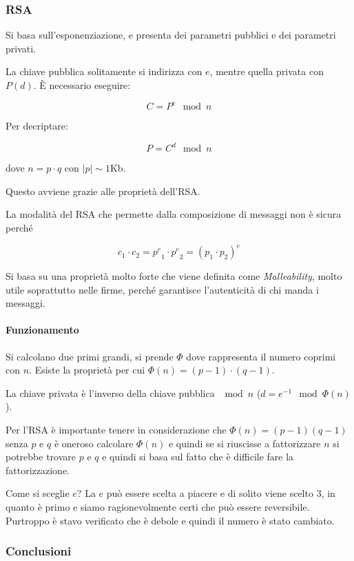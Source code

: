 \subsubsection{RSA}

Si basa sull'esponenziazione, e presenta dei parametri pubblici e dei parametri
privati.


La chiave pubblica solitamente si indirizza con $e$, mentre quella privata con
$P(d)$. È necessario eseguire:

\[ C = P^e \mod n \]

Per decriptare:

\[ P = C^d \mod n \]

dove $n = p \cdot q$ con $|p| \sim 1$Kb.

Questo avviene grazie alle proprietà dell'RSA.

La modalità del RSA che permette dalla composizione di messaggi non è sicura
perché

\[ c_1 \cdot c_2 = {p^e}_1 \cdot {p^e}_2 = (p_1 \cdot p_2)^e\]


Si basa su una proprietà molto forte che viene definita come
\textit{Malleability}, molto utile soprattutto nelle firme, perché garantisce
l'autenticità di chi manda i messaggi.


\paragraph{Funzionamento}

Si calcolano due primi grandi, si prende $\Phi$ dove rappresenta il numero
coprimi con $n$.
Esiste la proprietà per cui $\Phi(n) = (p-1) \cdot (q-1)$.

La chiave privata è l'inverso della chiave pubblica $\mod n$ ($d = e^{-1}
\mod \Phi(n)$).

Per l'RSA \`e importante tenere in considerazione che $\Phi(n) = (p-1)(q-1)$
senza $p$ e $q$ è oneroso calcolare $\Phi(n)$ e quindi se si riuscisse a
fattorizzare $n$ si potrebbe trovare $p$ e $q$ e quindi si basa sul fatto che è
difficile fare la fattorizzazione.

Come si sceglie $e$? La $e$ può essere scelta a piacere e di solito viene scelto
$3$, in quanto è primo e siamo ragionevolmente certi che può essere reversibile.
Purtroppo è stavo verificato che è debole e quindi il numero è stato cambiato.

\subsubsection{Conclusioni}

